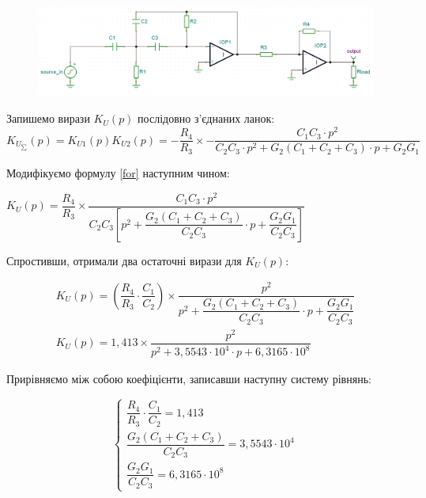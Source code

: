 \documentclass[14pt,a4paper]{scrartcl}
\begin{document}
\begin{figure}[!h]\TopFloatBoxes\CenterFloatBoxes
{}%
           {\includegraphics[width=\textwidth]{rauh}}
\end{figure}
\newpage
Запишемо вирази $K_U(p)$ послідовно з'єднаних ланок:
\begin{equation}\label{for}
K_{U_{\sum}}(p)=K_{U1}(p)K_{U2}(p)=-\dfrac{R_4}{R_3}\times-\dfrac{C_1C_3\cdot p^2}{C_2C_3\cdot p^2+G_2(C_1+C_2+C_3)\cdot p+G_2G_1}
\end{equation} 

Модифікуємо формулу \eqref{for} наступним чином:
\begin{center}
$K_U(p)=\dfrac{R_4}{R_3}\times\dfrac{C_1C_3\cdot p^2}{C_2C_3\left[p^2+\dfrac{G_2(C_1+C_2+C_3)}{C_2C_3}\cdot p+\dfrac{G_2G_1}{C_2C_3}\right]}$
\end{center}

Спростивши, отримали два остаточні вирази для $K_U(p)$:

\begin{equation}
\boxed{
\begin{aligned}
K_U(p)=\left(\dfrac{R_4}{R_3}\cdot\dfrac{C_1}{C_2}\right)\times\dfrac{p^2}{p^2+\dfrac{G_2(C_1+C_2+C_3)}{C_2C_3}\cdot p+\dfrac{G_2G_1}{C_2C_3}}\\[0.5cm]
K_U(p)=1,413\times\dfrac{p^2}{p^2+3,5543\cdot{10^4}\cdot p+6,3165\cdot{10^8}}
\end{aligned}}
\end{equation}


Прирівняємо між собою коефіцієнти, записавши наступну систему рівнянь:

\begin{equation*}
\begin{cases}
\dfrac{R_4}{R_3}\cdot\dfrac{C_1}{C_2}=1,413\\[0.5cm]
\dfrac{G_2(C_1+C_2+C_3)}{C_2C_3}=3,5543\cdot{10^4}\\[0.5cm]
\dfrac{G_2G_1}{C_2C_3}=6,3165\cdot{10^8}
\end{cases}
\end{equation*}
\end{document}
